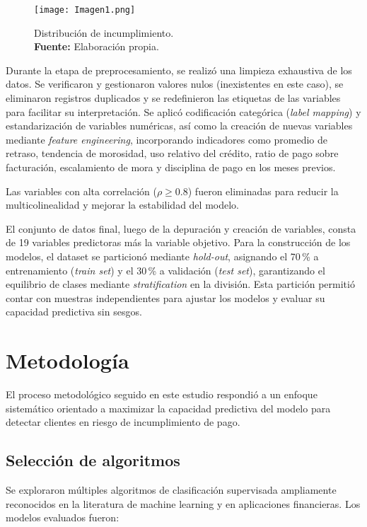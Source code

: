 \documentclass[journal]{apa7}
\begin{document}
\begin{figure}[ht]
  \centering
  \texttt{[image: Imagen1.png]}
 \caption{Distribución de incumplimiento. \\ \textbf{Fuente:} Elaboración propia.}
  \label{fig:distribucion-incumplimiento}
\end{figure}

Durante la etapa de preprocesamiento, se realizó una limpieza exhaustiva de los datos. Se verificaron y gestionaron valores nulos (inexistentes en este caso), se eliminaron registros duplicados y se redefinieron las etiquetas de las variables para facilitar su interpretación. Se aplicó codificación categórica (\emph{label mapping}) y estandarización de variables numéricas, así como la creación de nuevas variables mediante \emph{feature engineering}, incorporando indicadores como promedio de retraso, tendencia de morosidad, uso relativo del crédito, ratio de pago sobre facturación, escalamiento de mora y disciplina de pago en los meses previos.

Las variables con alta correlación ($\rho \geq 0.8$) fueron eliminadas para reducir la multicolinealidad y mejorar la estabilidad del modelo.

El conjunto de datos final, luego de la depuración y creación de variables, consta de 19 variables predictoras más la variable objetivo. Para la construcción de los modelos, el dataset se particionó mediante \emph{hold-out}, asignando el 70\,\% a entrenamiento (\emph{train set}) y el 30\,\% a validación (\emph{test set}), garantizando el equilibrio de clases mediante \emph{stratification} en la división. Esta partición permitió contar con muestras independientes para ajustar los modelos y evaluar su capacidad predictiva sin sesgos.

\section{Metodología}

El proceso metodológico seguido en este estudio respondió a un enfoque sistemático orientado a maximizar la capacidad predictiva del modelo para detectar clientes en riesgo de incumplimiento de pago.

\subsection{Selección de algoritmos}

Se exploraron múltiples algoritmos de clasificación supervisada ampliamente reconocidos en la literatura de machine learning y en aplicaciones financieras. Los modelos evaluados fueron:
\end{document}
